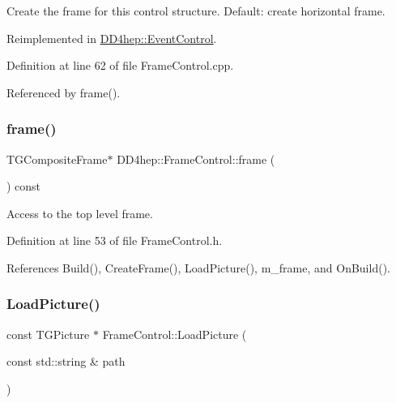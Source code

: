 Create the frame for this control structure. Default\+: create horizontal frame. 



Reimplemented in \hyperlink{class_d_d4hep_1_1_event_control_a10479ca8f5f5836f6e3a9c1367eea1fb}{D\+D4hep\+::\+Event\+Control}.



Definition at line 62 of file Frame\+Control.\+cpp.



Referenced by frame().

\hypertarget{class_d_d4hep_1_1_frame_control_a0c4c3be45b2555db5aa71f8eee7b908b}{}\label{class_d_d4hep_1_1_frame_control_a0c4c3be45b2555db5aa71f8eee7b908b} 
\subsubsection{\texorpdfstring{frame()}{frame()}}
{\footnotesize\ttfamily T\+G\+Composite\+Frame$\ast$ D\+D4hep\+::\+Frame\+Control\+::frame (\begin{DoxyParamCaption}{ }\end{DoxyParamCaption}) const\hspace{0.3cm}{\ttfamily [inline]}}



Access to the top level frame. 



Definition at line 53 of file Frame\+Control.\+h.



References Build(), Create\+Frame(), Load\+Picture(), m\+\_\+frame, and On\+Build().

\hypertarget{class_d_d4hep_1_1_frame_control_a9c86d20503c0dcf96f5a13bced00ecc0}{}\label{class_d_d4hep_1_1_frame_control_a9c86d20503c0dcf96f5a13bced00ecc0} 
\subsubsection{\texorpdfstring{Load\+Picture()}{LoadPicture()}}
{\footnotesize\ttfamily const T\+G\+Picture $\ast$ Frame\+Control\+::\+Load\+Picture (\begin{DoxyParamCaption}\item[{const std\+::string \&}]{path }\end{DoxyParamCaption})\hspace{0.3cm}{\ttfamily [virtual]}}



